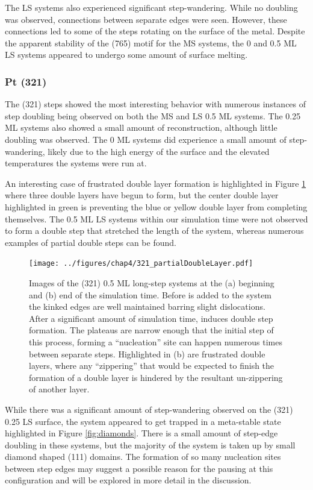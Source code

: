 The LS systems also experienced significant step-wandering. While no doubling
was observed, connections between separate edges were seen. However, these
connections led to some of the steps rotating on the surface of the metal.
Despite the apparent stability of the (765) motif for the MS systems, the 0 and
0.5 ML LS systems appeared to undergo some amount of surface melting.

\subsubsection{Pt (321)}
The (321) steps showed the most interesting behavior with numerous instances of
step doubling being observed on both the MS and LS 0.5 ML systems. The 0.25 ML
systems also showed a small amount of reconstruction, although little doubling
was observed. The 0 ML systems did experience a small amount of step-wandering,
likely due to the high energy of the surface and the elevated temperatures the
systems were run at.

An interesting case of frustrated double layer formation is highlighted in
Figure \ref{fig:partialDoubleLayer} where three double layers have begun to form,
but the center double layer highlighted in green is preventing the blue or
yellow double layer from completing themselves. The 0.5 ML LS systems within
our simulation time were not observed to form a double step that stretched the
length of the system, whereas numerous examples of partial double steps can be
found.

\begin{figure}
\centering
\texttt{[image: ../figures/chap4/321\_partialDoubleLayer.pdf]}
\caption{Images of the (321) 0.5 ML long-step systems at the (a) beginning and
(b) end of the simulation time. Before  is added to the system the
kinked edges are well maintained barring slight dislocations. After a
significant amount of simulation time,  induces double step formation.
The plateaus are narrow enough that the initial step of this process, forming a
``nucleation'' site can happen numerous times between separate steps.
Highlighted in (b) are frustrated double layers, where any ``zippering'' that
would be expected to finish the formation of a double layer is hindered by the
resultant un-zippering of another layer.}
\label{fig:partialDoubleLayer}
\end{figure}

While there was a significant amount of step-wandering observed on the (321)
0.25 LS surface, the system appeared to get trapped in a meta-stable state
highlighted in Figure \ref{fig:diamonds}. There is a small amount of step-edge
doubling in these systems, but the majority of the system is taken up by small
diamond shaped (111) domains. The formation of so many nucleation sites between
step edges may suggest a possible reason for the pausing at this configuration
and will be explored in more detail in the discussion.

